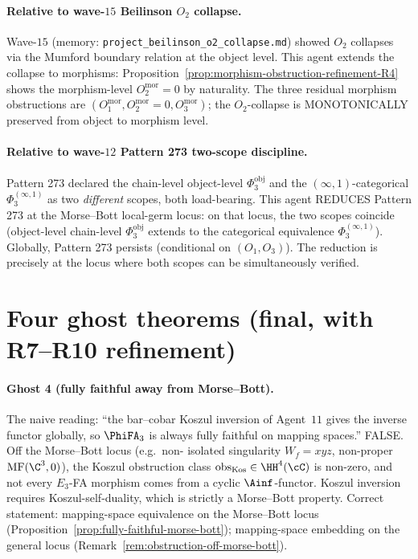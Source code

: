 \paragraph{Relative to wave-$15$ Beilinson $O_2$ collapse.}
Wave-$15$ (memory: \texttt{project\_beilinson\_o2\_collapse.md}) showed
$O_2$ collapses via the Mumford boundary relation at the object
level.  This agent extends the collapse to morphisms:
Proposition~\ref{prop:morphism-obstruction-refinement-R4} shows the
morphism-level $O_2^{\mathrm{mor}} = 0$ by naturality.  The three
residual morphism obstructions are $(O_1^{\mathrm{mor}},
O_2^{\mathrm{mor}} = 0, O_3^{\mathrm{mor}})$; the $O_2$-collapse is
MONOTONICALLY preserved from object to morphism level.

\paragraph{Relative to wave-$12$ Pattern 273 two-scope discipline.}
Pattern 273 declared the chain-level object-level $\Phi_3^{\mathrm{obj}}$
and the $(\infty,1)$-categorical $\Phi_3^{(\infty,1)}$ as two
\emph{different} scopes, both load-bearing.  This agent REDUCES
Pattern 273 at the Morse--Bott local-germ locus: on that locus, the
two scopes coincide (object-level chain-level $\Phi_3^{\mathrm{obj}}$
extends to the categorical equivalence $\Phi_3^{(\infty,1)}$).
Globally, Pattern 273 persists (conditional on $(O_1, O_3)$).  The
reduction is precisely at the locus where both scopes can be
simultaneously verified.

\section*{Four ghost theorems (final, with R7--R10 refinement)}

\paragraph{Ghost 4 (fully faithful away from Morse--Bott).}  The naive
reading: ``the bar--cobar Koszul inversion of Agent~$11$ gives the
inverse functor globally, so $\PhiFA_3$ is always fully faithful on
mapping spaces.''  FALSE.  Off the Morse--Bott locus (e.g.\ non-
isolated singularity $W_f = xyz$, non-proper $\mathrm{MF}(\C^3, 0)$),
the Koszul obstruction class $\mathrm{obs}_{\mathrm{Kos}} \in \HH^4(\cC)$
is non-zero, and not every $E_3$-FA morphism comes from a cyclic
$\Ainf$-functor.  Koszul inversion requires Koszul-self-duality,
which is strictly a Morse--Bott property.  Correct statement:
mapping-space equivalence on the Morse--Bott locus
(Proposition~\ref{prop:fully-faithful-morse-bott}); mapping-space
embedding on the general locus
(Remark~\ref{rem:obstruction-off-morse-bott}).

